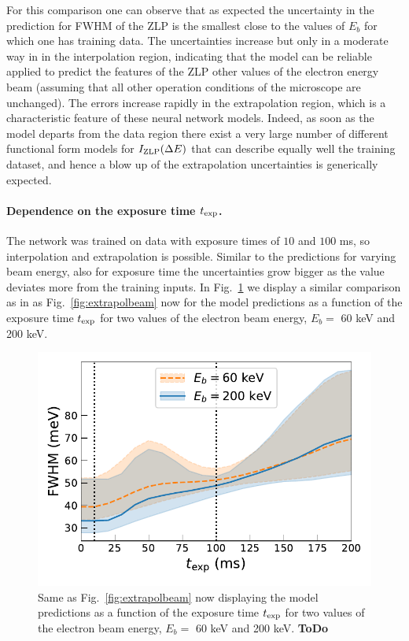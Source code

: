 For this comparison one can observe that as expected the uncertainty in the  prediction for FWHM
of the ZLP is the smallest close to the values of $E_b$ for which one has training data.
%
The uncertainties increase but only in a moderate way in in the interpolation region, indicating that
the model can be reliable applied to predict the features of the ZLP other values of the electron
energy beam (assuming that all other operation conditions of the microscope are unchanged).
%
The errors increase rapidly in the extrapolation region, which is a characteristic feature of
these neural network models.
%
Indeed, as soon as the model departs from the data region there exist a very large
number of different functional form models for $I_{\rm ZLP}(\Delta E)$ that can describe equally well
the training dataset, and hence a blow up of the extrapolation uncertainties is generically expected.

\paragraph{Dependence on the exposure time $t_{\rm exp}$.}
%
The network was trained on data with exposure times of $10$ and $100$ ms, so interpolation and extrapolation is possible. Similar to the predictions for varying beam energy, also for exposure time the uncertainties grow bigger as the value deviates more from the training inputs.
%
In Fig.~\ref{fig:extrapotime} we display a similar comparison as in
as Fig.~\ref{fig:extrapolbeam} now for the model
      predictions as a function of the exposure time $t_{\rm exp}$
for two values of the electron beam energy, $E_b=$ 60 keV and 200 keV.

\begin{figure}[t]
  \centering
    \includegraphics[width=120mm]{plots/Time_extrapolation.pdf}
    \caption{Same as Fig.~\ref{fig:extrapolbeam} now displaying the model
      predictions as a function of the exposure time $t_{\rm exp}$
for two values of the electron beam energy, $E_b=$ 60 keV and 200 keV.
      {\bf ToDo}}
    \label{fig:extrapotime}
\end{figure}

